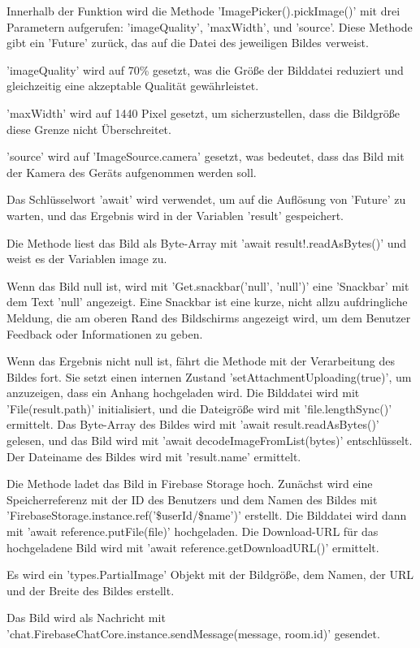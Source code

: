 Innerhalb der Funktion wird die Methode 'ImagePicker().pickImage()' mit drei Parametern aufgerufen: 'imageQuality', 'maxWidth', und 'source'. Diese Methode gibt ein 'Future' zurück, das auf die Datei des jeweiligen Bildes verweist.

'imageQuality' wird auf 70\% gesetzt, was die Größe der Bilddatei reduziert und gleichzeitig eine akzeptable Qualität gewährleistet.

'maxWidth' wird auf 1440 Pixel gesetzt, um sicherzustellen, dass die Bildgröße diese Grenze nicht Überschreitet.

'source' wird auf 'ImageSource.camera' gesetzt, was bedeutet, dass das Bild mit der Kamera des Geräts aufgenommen werden soll.

Das Schlüsselwort 'await' wird verwendet, um auf die Auflösung von 'Future' zu warten, und das Ergebnis wird in der Variablen 'result' gespeichert.

Die Methode liest das Bild als Byte-Array mit 'await result!.readAsBytes()' und weist es der Variablen image zu.

Wenn das Bild null ist, wird mit 'Get.snackbar('null', 'null')' eine 'Snackbar' mit dem Text 'null' angezeigt. Eine Snackbar ist eine kurze, nicht allzu aufdringliche Meldung, die am oberen Rand des Bildschirms angezeigt wird, um dem Benutzer Feedback oder Informationen zu geben.

Wenn das Ergebnis nicht null ist, fährt die Methode mit der Verarbeitung des Bildes fort.
Sie setzt einen internen Zustand 'setAttachmentUploading(true)', um anzuzeigen, dass ein Anhang hochgeladen wird.
Die Bilddatei wird mit 'File(result.path)' initialisiert, und die Dateigröße wird mit 'file.lengthSync()' ermittelt.
Das Byte-Array des Bildes wird mit 'await result.readAsBytes()' gelesen, und das Bild wird mit 'await decodeImageFromList(bytes)' entschlüsselt.
Der Dateiname des Bildes wird mit 'result.name' ermittelt.

Die Methode ladet das Bild in Firebase Storage hoch.
Zunächst wird eine Speicherreferenz mit der ID des Benutzers und dem Namen des Bildes mit 'FirebaseStorage.instance.ref('\$userId/\$name')'  erstellt.
Die Bilddatei wird dann mit 'await reference.putFile(file)' hochgeladen.
Die Download-URL für das hochgeladene Bild wird mit 'await reference.getDownloadURL()' ermittelt.

Es wird ein 'types.PartialImage' Objekt mit der Bildgröße, dem Namen, der URL und der Breite des Bildes erstellt.

Das Bild wird als Nachricht mit 'chat.FirebaseChatCore.instance.sendMessage(message, room.id)' gesendet.

